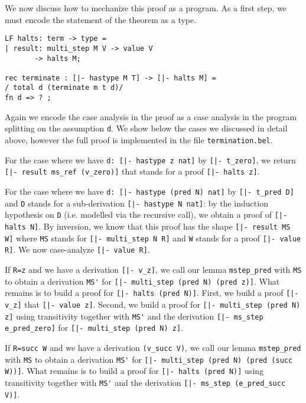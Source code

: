 We now discuss how to mechanize this proof as a program. As a first step, we
must encode the statement of the theorem as a type.

\begin{lstlisting}
LF halts: term -> type =
| result: multi_step M V -> value V
       -> halts M;

rec terminate : [|- hastype M T] -> [|- halts M] =
/ total d (terminate m t d)/
fn d => ? ;
\end{lstlisting}

Again we encode the case analysis in the proof as a case analysis in the program
splitting on the assumption \lstinline!d!. We show below the cases we discussed
in detail above, however the full proof is implemented in the file
\lstinline!termination.bel!.

For the case where we have \lstinline!d: [|- hastype z nat]! by
\lstinline![|- t_zero]!, we return \lstinline![|- result ms_ref (v_zero)]! that
stands for a proof \lstinline![|- halts z]!.

For the case where we have
\lstinline!d: [|- hastype (pred N) nat]! by \lstinline![|- t_pred D]! and
\lstinline!D! stands for a sub-derivation \lstinline![|- hastype N nat]!: by the
induction hypothesis on \lstinline!D! (i.e. modelled via the recursive call), we
obtain a proof of \lstinline![|- halts N]!.  By inversion, we know that this
proof has the shape \lstinline![|- result MS W]! where \lstinline!MS!
stands for \lstinline![|- multi_step N R]! and \lstinline!W!
stands for a proof \lstinline![|- value R]!. We now case-analyze
\mbox{\lstinline![|- value R]!}.

If \lstinline!R=z! and we have a derivation
\lstinline![|- v_z]!, we call our lemma \lstinline!mstep_pred! with
\lstinline!MS! to obtain a derivation \lstinline!MS'! for
\lstinline![|- multi_step (pred N) (pred z)]!. What remains is to build a proof
for \lstinline![|- halts (pred N)]!. First, we build a proof \lstinline![|- v_z]!
that \lstinline![|- value z]!. Second, we build a proof for
\lstinline![|- multi_step (pred N) z]! using transitivity together with
\lstinline!MS'! and the derivation \lstinline![|- ms_step e_pred_zero]! for
\mbox{\lstinline![|- multi_step (pred N) z]!}.

If \lstinline!R=succ W! and we have a derivation
\lstinline!(v_succ V)!, we call our lemma \lstinline!mstep_pred! with
\lstinline!MS! to obtain a derivation \lstinline!MS'! for
\lstinline![|- multi_step (pred N) (pred (succ W))]!. What remains is to build a proof
for \lstinline![|- halts (pred N)]! using transitivity together with
\lstinline!MS'! and the derivation
\lstinline![|- ms_step (e_pred_succ V)]!.

